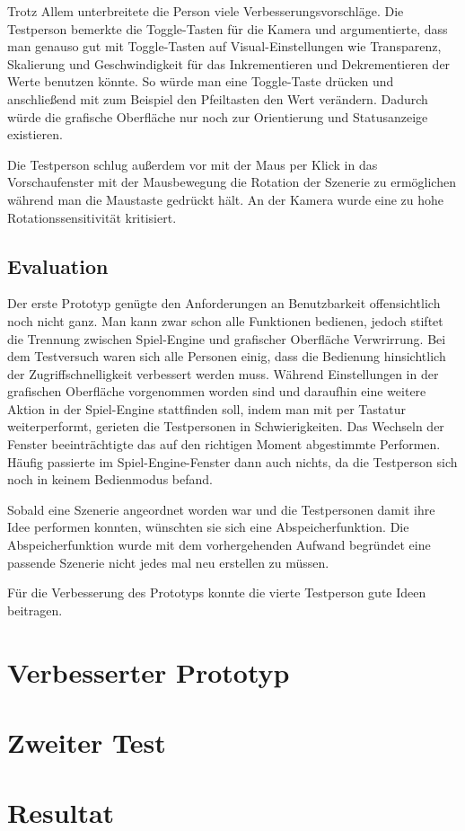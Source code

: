 Trotz Allem unterbreitete die Person viele Verbesserungsvorschl\"age. Die Testperson bemerkte die Toggle-Tasten f\"ur die
Kamera und argumentierte, dass man genauso gut mit Toggle-Tasten auf Visual-Einstellungen wie Transparenz, Skalierung 
und Geschwindigkeit f\"ur das Inkrementieren und Dekrementieren der Werte benutzen k\"onnte. So w\"urde man eine
Toggle-Taste dr\"ucken und anschlie\ss{}end mit zum Beispiel den Pfeiltasten den Wert ver\"andern. Dadurch w\"urde 
die grafische Oberfl\"ache nur noch zur Orientierung und Statusanzeige existieren. 


Die Testperson schlug au\ss{}erdem vor mit der Maus per Klick in das Vorschaufenster mit der Mausbewegung die Rotation
der Szenerie zu erm\"oglichen w\"ahrend man die Maustaste gedr\"uckt h\"alt. 
An der Kamera wurde eine zu hohe Rotationssensitivit\"at kritisiert.


\subsection{Evaluation}

Der erste Prototyp gen\"ugte den Anforderungen an Benutzbarkeit offensichtlich noch nicht ganz. Man kann zwar schon alle
Funktionen bedienen, jedoch stiftet die Trennung zwischen Spiel-Engine und grafischer Oberfl\"ache Verwrirrung.
Bei dem Testversuch waren sich alle Personen einig, dass die Bedienung hinsichtlich der Zugriffschnelligkeit verbessert werden 
muss. W\"ahrend Einstellungen in der grafischen Oberfl\"ache vorgenommen worden sind und daraufhin eine weitere Aktion 
in der Spiel-Engine stattfinden soll, indem man mit per Tastatur weiterperformt, gerieten die Testpersonen in Schwierigkeiten.
Das Wechseln der Fenster beeintr\"achtigte das auf den richtigen Moment abgestimmte Performen. H\"aufig passierte
im Spiel-Engine-Fenster dann auch nichts, da die Testperson sich noch in keinem Bedienmodus befand.

Sobald eine Szenerie angeordnet worden war und die Testpersonen damit ihre Idee performen konnten, w\"unschten sie sich
eine Abspeicherfunktion. Die Abspeicherfunktion wurde mit dem vorhergehenden Aufwand begr\"undet eine passende Szenerie
nicht jedes mal neu erstellen zu m\"ussen.

F\"ur die Verbesserung des Prototyps konnte die vierte Testperson gute Ideen beitragen.




\section{Verbesserter Prototyp}

\section{Zweiter Test}

\section{Resultat}
